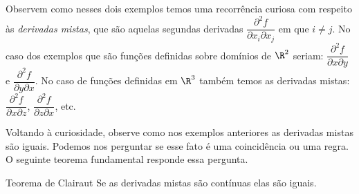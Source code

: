 Observem como nesses dois exemplos temos uma recorrência curiosa com respeito às \textit{derivadas mistas}, que são aquelas segundas derivadas $\dfrac{\partial ^2 f}{\partial x_i\partial x_j}$ em que $i\neq j$. No caso dos exemplos que são funções definidas sobre domínios de $\R^2$ seriam: $\dfrac{\partial ^2 f}{\partial x\partial y}$ e $\dfrac{\partial ^2 f}{\partial y\partial x}$. No caso de funções definidas em $\R^3$ também temos as derivadas mistas: $\dfrac{\partial ^2 f}{\partial x\partial z}$, $\dfrac{\partial ^2 f}{\partial z\partial x}$, etc.

Voltando à curiosidade, observe como nos exemplos anteriores as {derivadas mistas} são iguais. Podemos nos perguntar se esse fato é uma coincidência ou uma regra. O seguinte teorema fundamental responde essa pergunta. 
\begin{theorem}{Teorema de Clairaut}{}
Se as derivadas mistas são contínuas elas são iguais.  
\end{theorem}

